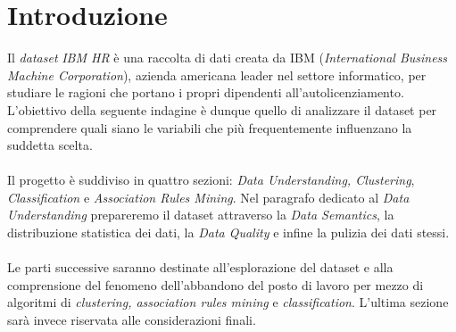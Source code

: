 \section{Introduzione}
Il \textit{dataset}\textit{ IBM HR }è una raccolta di dati creata da IBM (\textit{International Business Machine Corporation}), azienda americana leader nel settore informatico, per studiare le ragioni che portano i propri dipendenti all'autolicenziamento. L'obiettivo della seguente indagine è dunque quello di analizzare il dataset per comprendere quali siano le variabili che più frequentemente influenzano la suddetta scelta.
\\\\
Il progetto è suddiviso in quattro sezioni: \textit{Data Understanding, Clustering}, \textit{Classification} e \textit{Association Rules Mining}. Nel paragrafo dedicato al \textit{Data Understanding} prepareremo il dataset attraverso la \textit{Data Semantics}, la distribuzione statistica dei dati, la \textit{Data Quality} e infine la pulizia dei dati stessi. 
\\\\
Le parti successive saranno destinate all'esplorazione del dataset e alla comprensione del fenomeno dell'abbandono del posto di lavoro per mezzo di algoritmi di \textit{clustering, association rules mining} e \textit{classification}. L'ultima sezione sarà invece riservata alle considerazioni finali.
